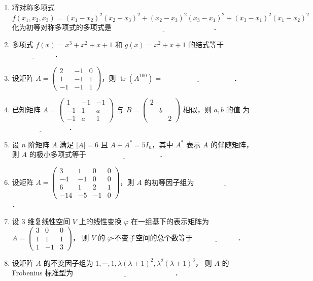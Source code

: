\begin{enumerate}
    \item 将对称多项式 $f(x_1, x_2, x_3) = (x_1 - x_2)^2(x_2 - x_3)^2 + (x_2 - x_3)^2(x_3 - x_1)^2 + (x_3 - x_1)^2(x_1 - x_2)^2$ 化为初等对称多项式的多项式是 $\underline{\qquad\qquad\qquad\qquad\qquad\qquad\qquad}$．

    \item 多项式 $f(x) = x^3 + x^2 + x + 1$ 和 $g(x) = x^2 + x + 1$ 的结式等于 $\underline{\qquad\qquad\qquad}$．

    \item 设矩阵 $A = \begin{pmatrix}
        2 & -1 & 0 \\
        1 & -1 & 1 \\
        -1 & -1 & 1
    \end{pmatrix}$，则 $\operatorname{tr}(A^{100}) = \underline{\qquad\qquad\qquad\qquad\qquad}$．

    \item 已知矩阵 $A = \begin{pmatrix}
        1 & -1 & -1 \\
        -1 & 1 & a \\
        -1 & a & 1
    \end{pmatrix}$ 与 $B = \begin{pmatrix}
        2 & & \\
         & b & \\
         & & 2
    \end{pmatrix}$ 相似，则 $a, b$ 的值
    为 $\underline{\qquad\qquad\qquad\qquad}$．

    \item 设 $n$ 阶矩阵 $A$ 满足 $|A| = 6$ 且 $A + A^* = 5I_n$，其中 $A^*$ 表示 $A$ 的伴随矩阵，
    则 $A$ 的极小多项式等于 $\underline{\qquad\qquad\qquad\qquad\qquad}$．

    \item 设矩阵 $A = \begin{pmatrix}
        3 & 1 & 0 & 0 \\
        -4 & -1 & 0 & 0 \\
        6 & 1 & 2 & 1 \\
        -14 & -5 & -1 & 0
    \end{pmatrix}$，则 $A$ 的初等因子组为 $\underline{\qquad\qquad\qquad\qquad}$．

    \item 设 $3$ 维复线性空间 $V$ 上的线性变换 $\varphi$ 在一组基下的表示矩阵为 $A = \begin{pmatrix}
        3 & 0 & 0 \\
        1 & 1 & 1 \\
        1 & -1 & 3
    \end{pmatrix}$，
    则 $V$ 的 $\varphi$-不变子空间的总个数等于 $\underline{\qquad\qquad\qquad}$．

    \item 设矩阵 $A$ 的不变因子组为
    $1, \cdots, 1, \lambda(\lambda+1)^2, \lambda^2(\lambda+1)^3$，
    则 $A$ 的 Frobenius 标准型为 $\underline{\qquad\qquad\qquad\qquad\qquad\qquad\qquad}$．
\end{enumerate}

